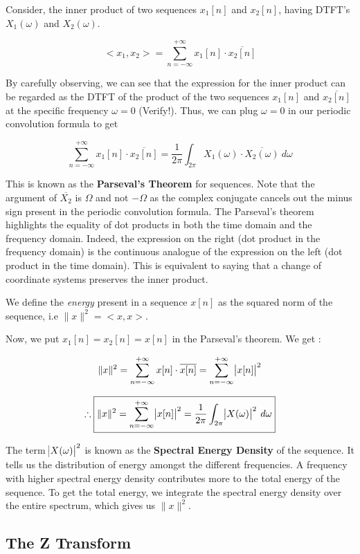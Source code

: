 \documentclass{article}
\theoremstyle{definition}
\begin{document}
Consider, the inner product of two sequences $x_1[n]$ and $x_2[n]$, having DTFT's $X_1(\omega)$ and $X_2(\omega)$. 

\[
	<x_1 , x_2> = \sum_{n = -\infty}^{+\infty} x_1[n] \cdot \overline{x_2[n]}
\]

By carefully observing, we can see that the expression for the inner product can be regarded as the DTFT of the product of the two sequences $x_1[n]$ and $\overline{x_2[n]}$ at the specific frequency $\omega = 0$ (Verify!). Thus, we can plug $\omega = 0$ in our periodic convolution formula to get 

\[
	\boxed{\sum_{n = -\infty}^{+\infty} x_1[n] \cdot \overline{x_2[n]} = \frac{1}{2\pi} \int_{2\pi} X_1(\omega) \cdot \overline{X_2(\omega)} \: d\omega}
\]

This is known as the \textbf{Parseval's Theorem} for sequences. Note that the argument of $\overline{X_2}$ is $\Omega$ and not $-\Omega$ as the complex conjugate cancels out the minus sign present in the periodic convolution formula. The Parseval's theorem highlights the equality of dot products in both the time domain and the frequency domain. Indeed, the expression on the right (dot product in the frequency domain) is the continuous analogue of the expression on the left (dot product in the time domain). This is equivalent to saying that a change of coordinate systems preserves the inner product. \smallskip

We define the \textit{energy} present in a sequence $x[n]$ as the squared norm of the sequence, i.e $\| x \| ^2 = <x,x>$.

Now, we put $x_1[n] = x_2[n] = x[n]$ in the Parseval's theorem. We get :

\[
	\|x\|^2 = \sum_{n = -\infty}^{+\infty} x[n] \cdot \overline{x[n]} = \sum_{n= -\infty}^{+\infty} \abs{x[n]}^2 
\]

\[
	\therefore \boxed{\|x\|^2 = \sum_{n= -\infty}^{+\infty} \abs{x[n]}^2 = \frac{1}{2\pi} \int_{2\pi} \abs{X(\omega)}^2 \: d\omega}
\]

The term $\abs{X(\omega)}^2$ is known as the \textbf{Spectral Energy Density} of the sequence. It tells us the distribution of energy amongst the different frequencies. A frequency with higher spectral energy density contributes more to the total energy of the sequence. To get the total energy, we integrate the spectral energy density over the entire spectrum, which gives us $\|x\|^2$.

\subsection{The Z Transform}
\end{document}

